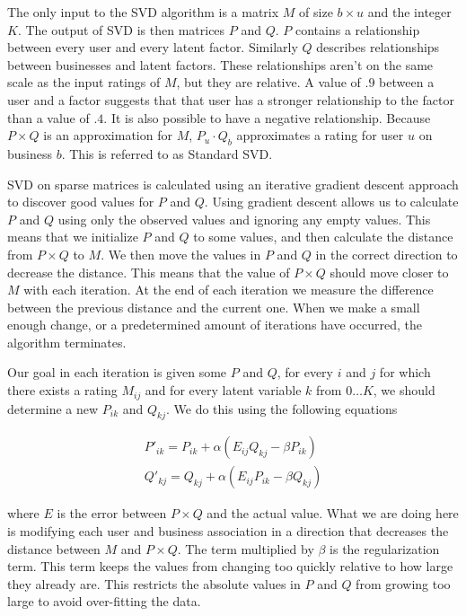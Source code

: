 The only input to the SVD algorithm is a matrix $M$ of size $b \times u$ and the
integer $K$. The output of SVD is then matrices $P$ and $Q$. $P$ contains a
relationship between every user and every latent factor. Similarly $Q$ describes
relationships between businesses and latent factors. These relationships aren't
on the same scale as the input ratings of $M$, but they are relative. A value
of $.9$ between a user and a factor suggests that that user has a stronger
relationship to the factor than a value of $.4$. It is also possible to have a
negative relationship. Because $P \times Q$ is an
approximation for $M$, $P_u \cdot Q_b$ approximates a rating for user $u$ on
business $b$. This is referred to as Standard SVD\cite{bellkor}.

SVD on sparse matrices is calculated using an iterative gradient descent
approach to discover good values for $P$ and $Q$. Using gradient descent allows
us to calculate $P$ and $Q$ using only the observed values and ignoring any
empty values. This means that we initialize $P$ and $Q$ to some values, and
then calculate the distance from $P \times Q$ to $M$. We then move the values
in $P$ and $Q$ in the correct direction to decrease the distance. 
This means that the value of $P \times Q$ should move closer
to $M$ with each iteration. At the end of each iteration we measure the
difference between the previous distance and the current one. When we make a
small enough change, or a predetermined amount of iterations have occurred, the algorithm terminates.

Our goal in each iteration is given some $P$ and $Q$, for every $i$ and $j$ for
which there exists a rating $M_{ij}$ and for every latent variable $k$ from
$0\ldots K$, we should determine a new $P_{ik}$ and $Q_{kj}$. We do this using the
following equations

\[
\begin{array}{c}
P'_{ik}=P_{ik} + \alpha(E_{ij}Q_{kj}-\beta P_{ik}) \\
Q'_{kj}=Q_{kj} + \alpha(E_{ij}P_{ik}-\beta Q_{kj})
\end{array}
\]

\noindent where $E$ is the error between $P \times Q$ and the actual value.
What we are doing here is modifying each user and business association in a
direction that decreases the distance between $M$ and $P \times Q$. The term
multiplied by $\beta$ is the regularization term. This term keeps the values
from changing too quickly relative to how large they already are. This
restricts the absolute values in $P$ and $Q$ from growing too large to avoid
over-fitting the data.

